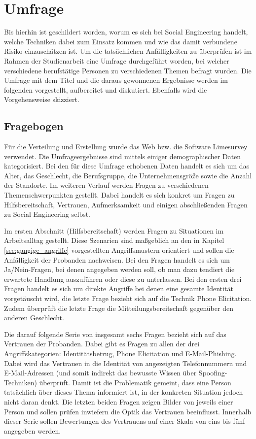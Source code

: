 \section{Umfrage}\label{sec:umfrage}
Bis hierhin ist geschildert worden, worum es sich bei Social Engineering handelt, welche Techniken dabei zum Einsatz kommen und wie das damit verbundene Risiko einzuschätzen ist.
Um die tatsächlichen Anfälligkeiten zu überprüfen ist im Rahmen der Studienarbeit eine Umfrage durchgeführt worden, bei welcher verschiedene berufstätige Personen zu verschiedenen Themen befragt wurden.
Die Umfrage mit dem Titel  und die daraus gewonnenen Ergebnisse werden im folgenden vorgestellt, aufbereitet und diskutiert.
Ebenfalls wird die Vorgehensweise skizziert.

\subsection{Fragebogen}
Für die Verteilung und Erstellung wurde das Web bzw. die Software Limesurvey verwendet.
Die Umfrageergebnisse sind mittels einiger demographischer Daten kategorisiert.
Bei den für diese Umfrage erhobenen Daten handelt es sich um das Alter, das Geschlecht, die Berufsgruppe, die Unternehmensgröße sowie die Anzahl der Standorte.
Im weiteren Verlauf werden Fragen zu verschiedenen Themenschwerpunkten gestellt.
Dabei handelt es sich konkret um Fragen zu Hilfsbereitschaft, Vertrauen, Aufmerksamkeit und einigen abschließenden Fragen zu Social Engineering selbst.

Im ersten Abschnitt (Hilfsbereitschaft) werden Fragen zu Situationen im Arbeitsalltag gestellt.
Diese Szenarien sind maßgeblich an den in Kapitel \ref{sec:gangige_angriffe} vorgestellten Angriffsmustern orientiert und sollen die Anfälligkeit der Probanden nachweisen.
Bei den Fragen handelt es sich um Ja/Nein-Fragen, bei denen angegeben werden soll, ob man dazu tendiert die erwartete Handlung auszuführen oder diese zu unterlassen.
Bei den ersten drei Fragen handelt es sich um direkte Angriffe bei denen eine gesamte Identität vorgetäuscht wird, die letzte Frage bezieht sich auf die Technik Phone Elicitation.
Zudem überprüft die letzte Frage die Mitteilungsbereitschaft gegenüber den anderen Geschlecht.

Die darauf folgende Serie von insgesamt sechs Fragen bezieht sich auf das Vertrauen der Probanden.
Dabei gibt es Fragen zu allen der drei Angriffskategorien: Identitätsbetrug, Phone Elicitation und E-Mail-Phishing.
Dabei wird das Vertrauen in die Identität von angezeigten Telefonnummern und E-Mail-Adressen (und somit indirekt das bewusste Wissen über Spoofing-Techniken) überprüft.
Damit ist die Problematik gemeint, dass eine Person tatsächlich über dieses Thema informiert ist, in der konkreten Situation jedoch nicht daran denkt.
Die letzten beiden Fragen zeigen Bilder von jeweils einer Person und sollen prüfen inwiefern die Optik das Vertrauen beeinflusst.
Innerhalb dieser Serie sollen Bewertungen des Vertrauens auf einer Skala von eins bis fünf angegeben werden.

